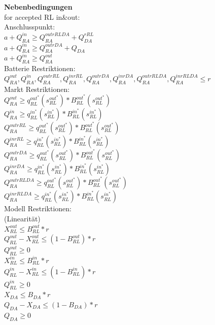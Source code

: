 \documentclass{article}
\begin{document}
\textbf{Nebenbedingungen}\\
for accepted RL in\&out:\\
Anschlusspunkt:\\
$a + Q^{in}_{RA} \geq Q^{outrRLDA}_{RA} + Q^{rRL}_{DA}$ \\
$a + Q^{in}_{RA} \geq Q^{outrDA}_{RA} + Q_{DA}$ \\
$a + Q^{in}_{RA} \geq Q^{out}_{RA}$ \\
Batterie Restriktionen:\\
$Q^{out}_{RA}, Q^{in}_{RA}, Q^{outrRL}_{RA}, Q^{inrRL}_{RA}, Q^{outrDA}_{RA}, Q^{inrDA}_{RA}, Q^{outrRLDA}_{RA}, Q^{inrRLDA}_{RA} \leq r$\\
Markt Restriktionen:\\
$Q^{out}_{RA} \geq q^{out^*}_{RL} (s^{out^*}_{RL}) * B^{out^*}_{RL} (s^{out^*}_{RL}) $\\
$Q^{in}_{RA} \geq q^{in^*}_{RL} (s^{in^*}_{RL}) * B^{in^*}_{RL} (s^{in^*}_{RL}) $\\
$Q^{outrRL}_{RA} \geq q^{out^*}_{RL} (s^{out^*}_{RL}) * B^{out^*}_{RL} (s^{out^*}_{RL}) $\\
$Q^{inrRL}_{RA} \geq q^{in^*}_{RL} (s^{in^*}_{RL}) * B^{in^*}_{RL} (s^{in^*}_{RL}) $\\
$Q^{outrDA}_{RA} \geq q^{out^*}_{RL} (s^{out^*}_{RL}) * B^{out^*}_{RL} (s^{out^*}_{RL}) $\\
$Q^{inrDA}_{RA} \geq q^{in^*}_{RL} (s^{in^*}_{RL}) * B^{in^*}_{RL} (s^{in^*}_{RL}) $\\
$Q^{outrRLDA}_{RA} \geq q^{out^*}_{RL} (s^{out^*}_{RL}) * B^{out^*}_{RL} (s^{out^*}_{RL}) $\\
$Q^{inrRLDA}_{RA} \geq q^{in^*}_{RL} (s^{in^*}_{RL}) * B^{in^*}_{RL} (s^{in^*}_{RL}) $\\
Modell Restriktionen:\\
(Linearität)\\
$X^{out}_{RL} \leq B^{out}_{RL} * r$ \\
$Q^{out}_{RL} - X^{out}_{RL} \leq (1-B^{out}_{RL}) * r$ \\
$Q^{out}_{RL} \geq 0$ \\
$X^{in}_{RL} \leq B^{in}_{RL} * r$ \\
$Q^{in}_{RL} - X^{in}_{RL} \leq (1-B^{in}_{RL}) * r$ \\
$Q^{in}_{RL} \geq 0$ \\
$X_{DA} \leq B_{DA} * r$ \\
$Q_{DA} - X_{DA} \leq (1-B_{DA}) * r$ \\
$Q_{DA} \geq 0$ \\
\end{document}
